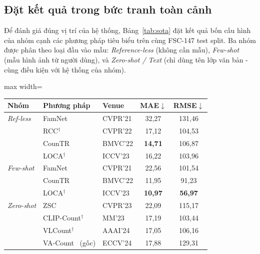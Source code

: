 \documentclass[a4paper,12pt]{report}
\numberwithin{figure}{chapter}
\numberwithin{table}{chapter}
\begin{document}
\subsection{Đặt kết quả trong bức tranh toàn cảnh}
\label{subsec:sota-comparison}

Để đánh giá đúng vị trí của hệ thống, Bảng~\ref{tab:sota} đặt kết quả bốn cấu hình của nhóm cạnh các phương pháp tiêu biểu trên cùng FSC-147 test split. Ba nhóm được phân theo loại đầu vào mẫu: \textit{Reference-less} (không cần mẫu), \textit{Few-shot} (mẫu hình ảnh từ người dùng), và \textit{Zero-shot / Text} (chỉ dùng tên lớp văn bản - cùng điều kiện với hệ thống của nhóm).

\begin{table}[H]
\centering
\small
\renewcommand{\arraystretch}{1.2}
\begin{adjustbox}{max width=\textwidth}
\begin{tabular}{|l|l|l|c|c|}
\hline
\rowcolor[HTML]{EFEFEF}
\textbf{Nhóm} & \textbf{Phương pháp} & \textbf{Venue} & \textbf{MAE}$\downarrow$ & \textbf{RMSE}$\downarrow$ \\
\hline
\textit{Ref-less}  & FamNet~\cite{famnet}               & CVPR'21  & 32{,}27          & 131{,}46 \\
                   & RCC$^\dagger$                      & CVPR'22  & 17{,}12          & 104{,}53 \\
                   & CounTR~\cite{countr}               & BMVC'22  & \textbf{14{,}71} & 106{,}87 \\
                   & LOCA$^\dagger$                     & ICCV'23  & 16{,}22          & 103{,}96 \\
\hline
\textit{Few-shot}  & FamNet~\cite{famnet}               & CVPR'21  & 22{,}56          & 101{,}54 \\
                   & CounTR~\cite{countr}               & BMVC'22  & 11{,}95          & 91{,}23  \\
                   & LOCA$^\dagger$                     & ICCV'23  & \textbf{10{,}97} & \textbf{56{,}97} \\
\hline
\textit{Zero-shot} & ZSC~\cite{zeroshot_counting_xu}    & CVPR'23  & 22{,}09          & 115{,}17 \\
                   & CLIP-Count$^\dagger$               & MM'23    & 17{,}19          & 103{,}44 \\
                   & VLCount$^\dagger$                  & AAAI'24  & 17{,}05          & 106{,}16 \\
                   & VA-Count~\cite{vacount} (gốc)      & ECCV'24  & 17{,}88          & 129{,}31 \\

\end{tabular}
\end{adjustbox}
\end{table}
\end{document}

